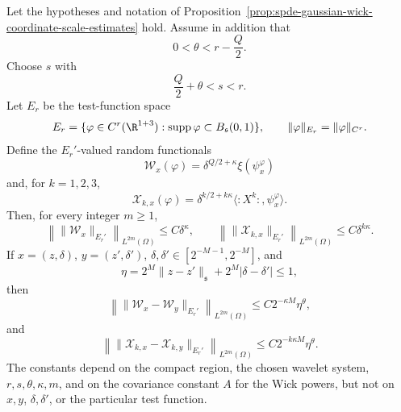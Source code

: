 \begin{proposition}
\label{prop:spde-gaussian-wick-dual-norm-coordinate-estimates}
Let the hypotheses and notation of
Proposition~\ref{prop:spde-gaussian-wick-coordinate-scale-estimates} hold.
Assume in addition that
\[
  0<\theta<r-\frac Q2 .
\]
Choose \(s\) with
\[
  \frac Q2+\theta<s<r .
\]
Let \(E_r\) be the test-function space
\[
  E_r=
  \{\varphi\in C^r(\R^{1+3}):
    \operatorname{supp}\varphi\subset B_{\mathfrak s}(0,1)\},
  \qquad
  \|\varphi\|_{E_r}=\|\varphi\|_{C^r}.
\]
Define the \(E_r'\)-valued random functionals
\[
  \mathcal W_x(\varphi)
  =
  \delta^{Q/2+\kappa}\xi(\psi_x^\varphi)
\]
and, for \(k=1,2,3\),
\[
  \mathcal X_{k,x}(\varphi)
  =
  \delta^{k/2+k\kappa}
  \langle :X^k:,\psi_x^\varphi\rangle .
\]
Then, for every integer \(m\geq1\),
\begin{equation}
  \left\|\|\mathcal W_x\|_{E_r'}\right\|_{L^{2m}(\Omega)}
  \leq C\delta^\kappa ,
  \qquad
  \left\|\|\mathcal X_{k,x}\|_{E_r'}\right\|_{L^{2m}(\Omega)}
  \leq C\delta^{k\kappa}.
  \label{eq:spde-gaussian-dual-norm-uniform}
\end{equation}
If \(x=(z,\delta)\), \(y=(z',\delta')\),
\(\delta,\delta'\in[2^{-M-1},2^{-M}]\), and
\[
  \eta=
  2^M\|z-z'\|_{\mathfrak s}+2^M|\delta-\delta'|\leq1,
\]
then
\begin{equation}
  \left\|\|\mathcal W_x-\mathcal W_y\|_{E_r'}\right\|_{L^{2m}(\Omega)}
  \leq
  C2^{-\kappa M}\eta^\theta ,
  \label{eq:spde-gaussian-dual-norm-white-edge}
\end{equation}
and
\begin{equation}
  \left\|\|\mathcal X_{k,x}-\mathcal X_{k,y}\|_{E_r'}\right\|_{L^{2m}(\Omega)}
  \leq
  C2^{-k\kappa M}\eta^\theta .
  \label{eq:spde-gaussian-dual-norm-wick-edge}
\end{equation}
The constants depend on the compact region, the chosen wavelet system,
\(r,s,\theta,\kappa,m\), and on the covariance constant \(A\) for the Wick
powers, but not on \(x,y\), \(\delta,\delta'\), or the particular test
function.
\end{proposition}

